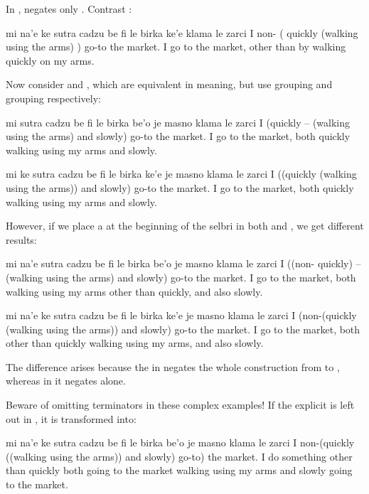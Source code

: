 In ,  negates only
    . Contrast :
\begin{example}
mi na'e ke sutra cadzu be fi le birka  ke'e\n
\T	klama le zarci\n
I non- ( quickly (walking using the arms) )\n
\T	go-to the market.\n
I go to the market, other than by walking\n
\T	quickly on my arms.
\end{example}

Now consider  and , which are equivalent in
    meaning, but use  grouping and  grouping
    respectively:
\begin{example}
mi sutra cadzu be fi le birka be'o je masno\n
\T	klama le zarci\n
I (quickly -- (walking using the arms) and slowly)\n
\T	go-to the market.\n
I go to the market, both quickly walking\n
\T	using my arms and slowly.
\end{example}

\begin{example}
mi ke sutra cadzu be fi le birka  ke'e\n
\T	je masno klama le zarci\n
I ((quickly (walking using the arms))\n
\T	and slowly) go-to the market.\n
I go to the market, both quickly walking\n
\T	using my arms and slowly.
\end{example}

However, if we place a  at the beginning of the
    selbri in both  and , we get different results:
\begin{example}
mi na'e sutra cadzu be fi le birka be'o\n
\T	je masno klama le zarci\n
I ((non- quickly) -- (walking using the arms)\n
\T	and slowly) go-to the market.\n
I go to the market, both walking using my arms\n
\T	other than quickly, and also slowly.
\end{example}

\begin{example}
mi na'e ke sutra cadzu be fi le birka  ke'e\n
\T	je masno klama le zarci\n
I (non-(quickly (walking using the arms))\n
\T	and slowly) go-to the market.\n
I go to the market, both other than quickly\n
\T	walking using my arms, and also slowly.
\end{example}

The difference arises because the  in  negates the whole construction
    from  to , whereas in  it negates  alone.

Beware of omitting terminators in these complex examples! If
    the explicit  is left out in , it is transformed into:
\begin{example}
mi na'e ke sutra cadzu be fi le birka be'o\n
\T	je masno klama  le zarci\n
I non-(quickly ((walking using the arms))\n
\T	and slowly) go-to) the market.\n
I do something other than quickly both\n
\T	going to the market walking using my arms\n
\T	and slowly going to the market.
\end{example}

